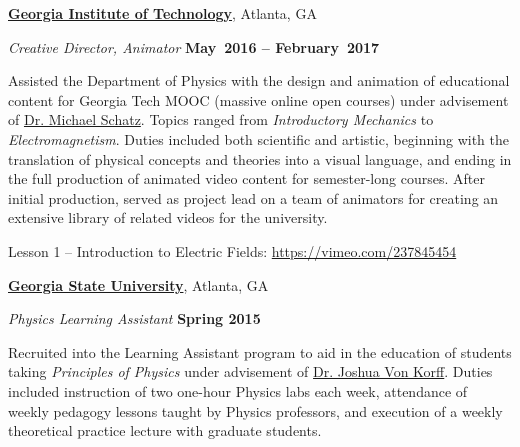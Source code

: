 \documentclass[10pt]{article}
\newcommand{\halfblankline}{\quad\vspace{-0.5\baselineskip}\pagebreak[3]}
\begin{document}
\href{https://www.gatech.edu/}{\textbf{Georgia Institute of Technology}},
Atlanta, GA
\begin{outerlist}
	
	\item[] \textit{Creative Director, Animator}%
	\hfill \textbf{May~2016 -- February~2017}
	\begin{innerlist}
			\item Assisted the Department of Physics with the design and animation of educational content for Georgia Tech MOOC (massive online open courses) under advisement of \href{https://physics.gatech.edu/user/michael-schatz} {Dr. Michael Schatz}. Topics ranged from \emph{Introductory Mechanics} to \emph{Electromagnetism}. Duties included both scientific and artistic, beginning with the translation of physical concepts and theories into a visual language, and ending in the full production of animated video content for semester-long courses. After initial production, served as project lead on a team of animators for creating an extensive library of related videos for the university.
			\item Lesson 1 -- Introduction to Electric Fields: \href{https://vimeo.com/237845454} {https://vimeo.com/237845454}
		\end{innerlist}
		
		\halfblankline
		
\end{outerlist}


\href{https://www.gsu.edu/}{\textbf{Georgia State University}},
Atlanta, GA
\begin{outerlist}
	
	\item[] \textit{Physics Learning Assistant}%
	\hfill \textbf{Spring 2015}
	\begin{innerlist}
		\item Recruited into the Learning Assistant program to aid in the education of students taking \emph{Principles of Physics} under advisement of \href{https://www.researchgate.net/scientific-contributions/Joshua-Von-Korff-15134139} {Dr. Joshua Von Korff}. Duties included instruction of two one-hour Physics labs each week, attendance of weekly pedagogy lessons taught by Physics professors, and execution of a weekly theoretical practice lecture with graduate students.
	\end{innerlist}
	
	\halfblankline
	
\end{outerlist}
\end{document}
